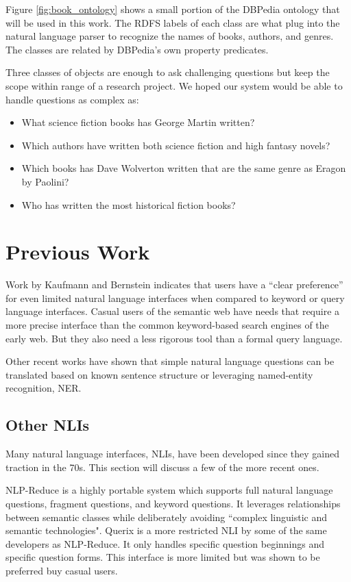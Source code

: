 \documentclass[11pt]{article}
\begin{document}
Figure \ref{fig:book_ontology} shows a small portion of the DBPedia ontology that
will be used in this work. The RDFS labels of each class are what plug into the
natural language parser to recognize the names of books, authors, and genres. 
The classes are related by DBPedia's own property predicates.

Three classes of objects are enough to ask challenging questions but keep the
scope within range of a research project. We hoped our system would be able to 
handle questions as complex as:
\begin{itemize}
\item What science fiction books has George Martin written?
\item Which authors have written both science fiction and high fantasy novels?
\item Which books has Dave Wolverton written that are the same genre as Eragon by Paolini?
\item Who has written the most historical fiction books? 
\end{itemize}

\section{Previous Work}

Work by Kaufmann and Bernstein \cite{usability} indicates
that users have a “clear preference” for even limited natural language interfaces
when compared to keyword or query language interfaces.
Casual users of the semantic web have needs that require a more precise interface
than the common keyword-based search engines of the early web. But they also
need a less rigorous tool than a formal query language. \cite{usability}

Other recent works \cite{mapping, freya, galitsky, nlp-reduce, galitsky2, querix}
have shown that simple natural language questions can be translated based
on known sentence structure or leveraging named-entity recognition, NER.

\subsection{Other NLIs}
Many natural language interfaces, NLIs, have been developed since they gained traction
in the 70s\cite{usability}. This section will discuss a few of the more recent ones.

NLP-Reduce\cite{usability,nlp-reduce} is a highly portable system which supports full
natural language questions, fragment questions, and keyword questions.
It leverages relationships between semantic classes while deliberately avoiding
``complex linguistic and semantic technologies"\cite{nlp-reduce}.
Querix\cite{querix} is a more restricted NLI by some of the same developers as
NLP-Reduce. It only handles specific question beginnings and specific question forms. 
This interface is more limited but was shown to be preferred buy casual 
users\cite{usability}.
\end{document}
